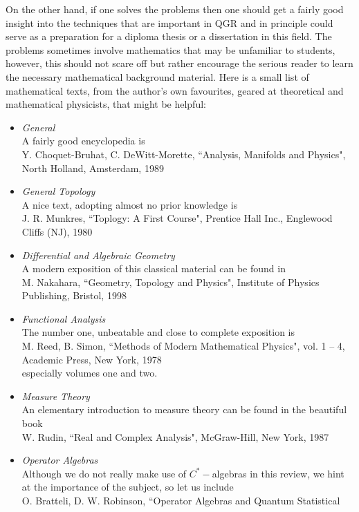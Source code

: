 \documentclass[12pt]{report}
\begin{document}
On the other hand, if one solves the problems then one should get a fairly
good insight into the techniques that are important in QGR and in 
principle could serve as a preparation for a diploma thesis or a 
dissertation in this field. The problems sometimes involve 
mathematics that may be unfamiliar to students, however, this should not 
scare off but rather encourage the serious reader to learn the necessary 
mathematical background material. Here is a small list of mathematical texts,
from the author's own favourites, geared at theoretical and mathematical 
physicists, that might be helpful: 
%
\begin{itemize}
%
\item {\it General}\\
A fairly good encyclopedia is\\ 
Y. Choquet-Bruhat, C. DeWitt-Morette, ``Analysis, Manifolds
and Physics", North Holland, Amsterdam, 1989
%
\item {\it General Topology} \\
A nice text, adopting almost no prior knowledge is\\
J. R. Munkres, ``Toplogy: A First Course", Prentice Hall Inc., Englewood 
Cliffs (NJ), 1980 
%
\item {\it Differential and Algebraic Geometry}\\
A modern exposition of this classical material can be found in\\
M. Nakahara, ``Geometry, Topology and Physics",
Institute of Physics Publishing, Bristol, 1998
%
\item {\it Functional Analysis}\\
The number one, unbeatable and close to complete exposition is \\
M. Reed, B. Simon, ``Methods of Modern Mathematical Physics",
vol. 1 -- 4, Academic Press, New York, 1978\\
especially volumes one and two.
%
\item {\it Measure Theory}\\
An elementary introduction to measure theory can be found in the beautiful
book\\
W. Rudin, ``Real and Complex Analysis", McGraw-Hill, New York, 1987
%
\item {\it Operator Algebras}\\
Although we do not really make use of $C^\ast-$algebras in this review,
we hint at the importance of the subject, so let us include\\ 
O. Bratteli, D. W. Robinson, ``Operator Algebras and Quantum Statistical

\end{itemize}
\end{document}
